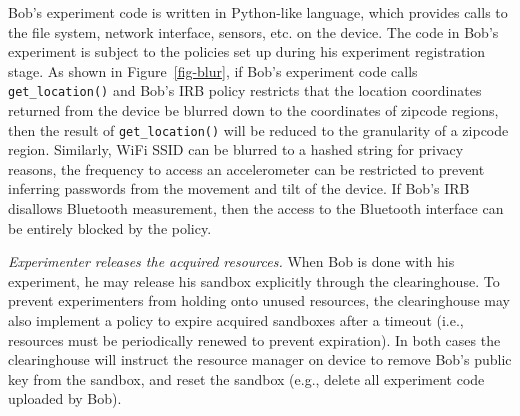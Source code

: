 Bob's experiment code is written in Python-like language, which provides
calls to the file system, network interface, sensors, etc. on the device. The
code in Bob's experiment is subject to the policies set up during his 
experiment registration stage. As shown in Figure~\ref{fig-blur}, if Bob's 
experiment code calls \texttt{get\_location()} and Bob's IRB policy restricts
that the location coordinates returned from the device be blurred down to 
the coordinates of zipcode regions, then the result of \texttt{get\_location()}
will be reduced to the granularity of a zipcode region. Similarly, WiFi SSID
can be blurred to a hashed string for privacy reasons, the frequency to 
access an accelerometer can be restricted to prevent inferring passwords 
from the movement and tilt of the device. If Bob's IRB disallows Bluetooth
measurement, then the access to the Bluetooth interface can be entirely 
blocked by the policy.



\emph{Experimenter releases the acquired resources.}  When Bob is done
with his experiment, he may release his sandbox explicitly
through the clearinghouse. To prevent experimenters from holding onto unused resources,
the clearinghouse may also implement a policy 
to expire acquired sandboxes after a
timeout (i.e., resources must be periodically renewed to prevent
expiration).
In both cases the clearinghouse will instruct the resource manager on device to
remove Bob's public key from the sandbox, and reset the sandbox (e.g., delete 
all experiment code uploaded by Bob).


